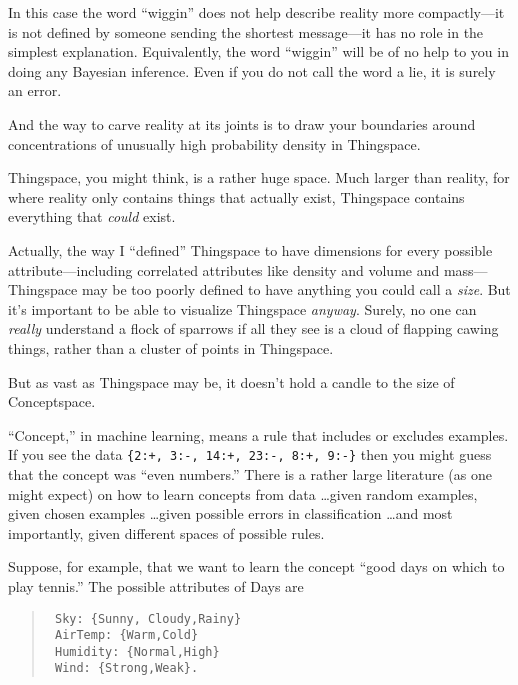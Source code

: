 {
 In this case the word
``wiggin'' does not help describe
reality more compactly---it is not defined by someone sending the
shortest message---it has no role in the simplest explanation.
Equivalently, the word ``wiggin''
will be of no help to you in doing any Bayesian inference. Even if you
do not call the word a lie, it is surely an error.}

{
 And the way to carve reality at its joints is to draw your
boundaries around concentrations of unusually high probability density
in Thingspace.}

\myendsectiontext


{
 Thingspace, you might think, is a rather huge space. Much larger
than reality, for where reality only contains things that actually
exist, Thingspace contains everything that \textit{could} exist. }

{
 Actually, the way I ``defined''
Thingspace to have dimensions for every possible attribute---including
correlated attributes like density and volume and mass---Thingspace may
be too poorly defined to have anything you could call a \textit{size}.
But it's important to be able to visualize Thingspace
\textit{anyway}. Surely, no one can \textit{really} understand a flock
of sparrows if all they see is a cloud of flapping cawing things,
rather than a cluster of points in Thingspace.}

{
 But as vast as Thingspace may be, it doesn't hold
a candle to the size of Conceptspace.}

{
 ``Concept,'' in machine
learning, means a rule that includes or excludes examples. If you see
the data \texttt{\{2:+, 3:-, 14:+, 23:-, 8:+,
9:-\}} then you might guess that the
concept was ``even numbers.'' There
is a rather large literature (as one might expect) on how to learn
concepts from data \ldots given random examples, given chosen examples
\ldots given possible errors in classification \ldots and most
importantly, given different spaces of possible rules.}

{
 Suppose, for example, that we want to learn the concept
``good days on which to play
tennis.'' The possible attributes of Days are}

\begin{verse}
\texttt{ Sky: \{Sunny, Cloudy,Rainy\} }\\
\texttt{ AirTemp: \{Warm,Cold\} }\\
\texttt{ Humidity: \{Normal,High\} }\\
\texttt{ Wind: \{Strong,Weak\}. }\\
\end{verse}

